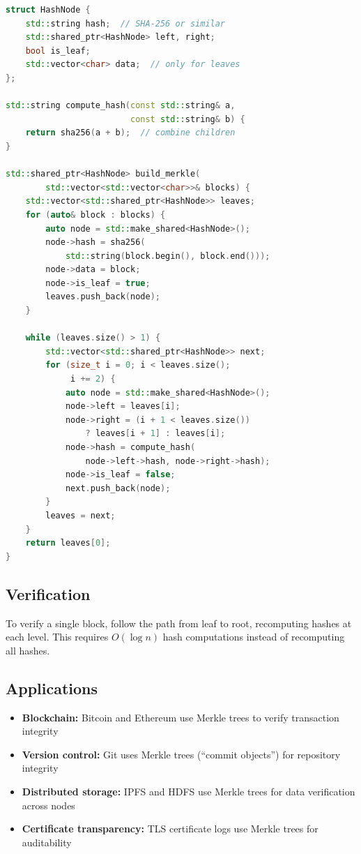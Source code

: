 \begin{lstlisting}[language=C++]
struct HashNode {
    std::string hash;  // SHA-256 or similar
    std::shared_ptr<HashNode> left, right;
    bool is_leaf;
    std::vector<char> data;  // only for leaves
};

std::string compute_hash(const std::string& a,
                         const std::string& b) {
    return sha256(a + b);  // combine children
}

std::shared_ptr<HashNode> build_merkle(
        std::vector<std::vector<char>>& blocks) {
    std::vector<std::shared_ptr<HashNode>> leaves;
    for (auto& block : blocks) {
        auto node = std::make_shared<HashNode>();
        node->hash = sha256(
            std::string(block.begin(), block.end()));
        node->data = block;
        node->is_leaf = true;
        leaves.push_back(node);
    }

    while (leaves.size() > 1) {
        std::vector<std::shared_ptr<HashNode>> next;
        for (size_t i = 0; i < leaves.size();
             i += 2) {
            auto node = std::make_shared<HashNode>();
            node->left = leaves[i];
            node->right = (i + 1 < leaves.size())
                ? leaves[i + 1] : leaves[i];
            node->hash = compute_hash(
                node->left->hash, node->right->hash);
            node->is_leaf = false;
            next.push_back(node);
        }
        leaves = next;
    }
    return leaves[0];
}
\end{lstlisting}

\subsection{Verification}

To verify a single block, follow the path from leaf to root, recomputing hashes at each level. This requires $O(\log n)$ hash computations instead of recomputing all hashes.

\subsection{Applications}

\begin{itemize}
    \item \textbf{Blockchain:} Bitcoin and Ethereum use Merkle trees to verify transaction integrity
    \item \textbf{Version control:} Git uses Merkle trees (``commit objects'') for repository integrity
    \item \textbf{Distributed storage:} IPFS and HDFS use Merkle trees for data verification across nodes
    \item \textbf{Certificate transparency:} TLS certificate logs use Merkle trees for auditability
\end{itemize}

